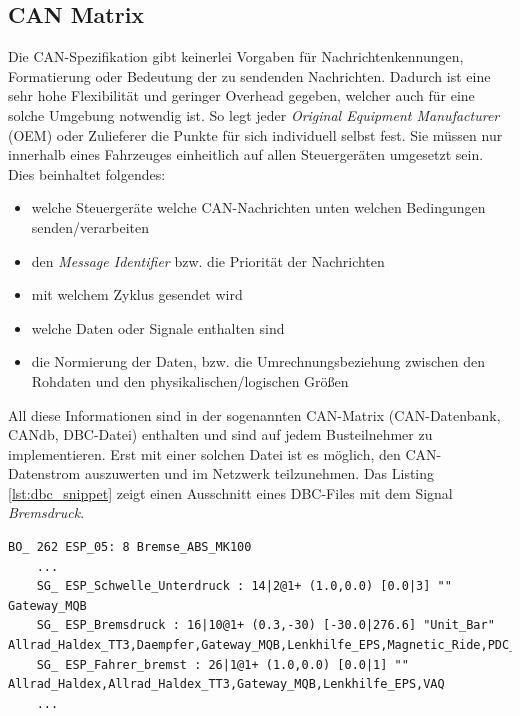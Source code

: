 \subsection{CAN Matrix}

Die CAN-Spezifikation gibt keinerlei Vorgaben für Nachrichtenkennungen, Formatierung oder Bedeutung der zu sendenden Nachrichten. Dadurch ist eine sehr hohe Flexibilität und geringer Overhead gegeben, welcher auch für eine solche Umgebung notwendig ist. So legt jeder \textit{Original Equipment Manufacturer} (OEM) oder Zulieferer die Punkte für sich individuell selbst fest. Sie müssen nur innerhalb eines Fahrzeuges einheitlich auf allen Steuergeräten umgesetzt sein. Dies beinhaltet folgendes:

\begin{itemize}
	\item welche Steuergeräte welche CAN-Nachrichten unten welchen Bedingungen senden/verarbeiten
	\item den \textit{Message Identifier} bzw. die Priorität der Nachrichten
	\item mit welchem Zyklus gesendet wird
	\item welche Daten oder Signale enthalten sind
	\item die Normierung der Daten, bzw. die Umrechnungsbeziehung zwischen den Rohdaten und den physikalischen/logischen Größen
\end{itemize}

All diese Informationen sind in der sogenannten CAN-Matrix (CAN-Datenbank, CANdb, DBC-Datei) enthalten und sind auf jedem Busteilnehmer zu implementieren. Erst mit einer solchen Datei ist es möglich, den CAN-Datenstrom auszuwerten und im Netzwerk teilzunehmen. Das Listing \ref{lst:dbc_snippet} zeigt einen Ausschnitt eines DBC-Files mit dem Signal \textit{Bremsdruck}.

\begin{lstlisting}[frame=lines, caption=Ausschnitt CAN DBC-File, captionpos=b, label = lst:dbc_snippet, showstringspaces=false, basicstyle=\footnotesize]
BO_ 262 ESP_05: 8 Bremse_ABS_MK100
    ...
    SG_ ESP_Schwelle_Unterdruck : 14|2@1+ (1.0,0.0) [0.0|3] ""  Gateway_MQB
    SG_ ESP_Bremsdruck : 16|10@1+ (0.3,-30) [-30.0|276.6] "Unit_Bar"  Allrad_Haldex_TT3,Daempfer,Gateway_MQB,Lenkhilfe_EPS,Magnetic_Ride,PDC_PLA,PDC_PLA_ARA
    SG_ ESP_Fahrer_bremst : 26|1@1+ (1.0,0.0) [0.0|1] ""  Allrad_Haldex,Allrad_Haldex_TT3,Gateway_MQB,Lenkhilfe_EPS,VAQ
    ...
\end{lstlisting}

